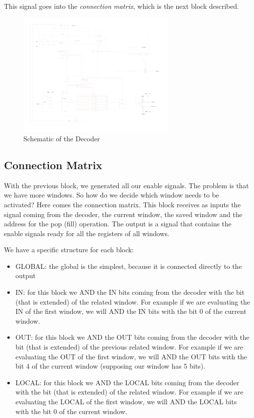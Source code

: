 \documentclass{article}
\begin{document}
This signal goes into the \emph{connection matrix}, which is the next block described. 

\begin{figure}[ht]
    \centering
    \includegraphics[width=0.7\textwidth]{Immagini/Decoder.pdf}
    \caption{Schematic of the Decoder}
    \label{decoder}
\end{figure}

\newpage
\subsection{Connection Matrix}

With the previous block, we generated all our enable signals. The problem is that we have more windows. So how do we decide which window needs to be activated? Here comes the connection matrix. This block receives as inputs the signal coming from the decoder, the current window, the saved window and the address for the pop (fill) operation. The output is a signal that contains the enable signals ready for all the registers of all windows. 

We have a specific structure for each block:
\begin{itemize}
  \item GLOBAL: the global is the simplest, because it is connected directly to the output
  \item IN: for this block we AND the IN bits coming from the decoder with the bit (that is extended) of the related window. For example if we are evaluating the IN of the first window, we will AND the IN bits with the bit 0 of the current window.
  \item OUT: for this block we AND the OUT bits coming from the decoder with the bit (that is extended) of the previous related window. For example if we are evaluating the OUT of the first window, we will AND the OUT bits with the bit 4 of the current window (supposing our window has 5 bits).
  \item LOCAL: for this block we AND the LOCAL bits coming from the decoder with the bit (that is extended) of the related window. For example if we are evaluating the LOCAL of the first window, we will AND the LOCAL bits with the bit 0 of the current window.
\end{itemize}
\end{document}
